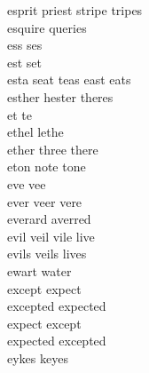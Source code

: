 esprit priest stripe tripes\\
esquire queries\\
ess ses\\
est set\\
esta seat teas east eats\\
esther hester theres\\
et te\\
ethel lethe\\
ether three there\\
eton note tone\\
eve vee\\
ever veer vere\\
everard averred\\
evil veil vile live\\
evils veils lives\\
ewart water\\
except expect\\
excepted expected\\
expect except\\
expected excepted\\
eykes keyes\\

